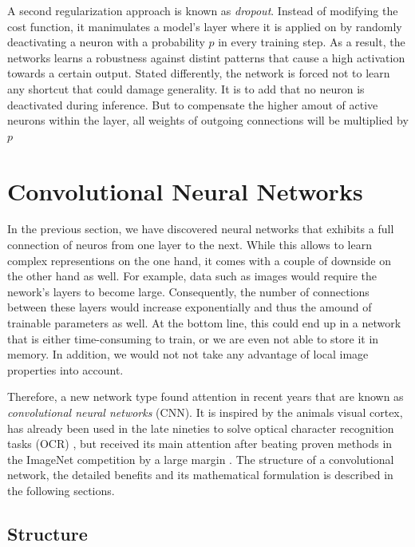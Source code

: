 A second regularization approach is known as \textit{dropout}. Instead of modifying the cost function, it manimulates a model's layer where it is applied on by randomly deactivating a neuron with a probability $p$ in every training step. As a result, the networks learns a robustness against distint patterns that cause a high activation towards a certain output. Stated differently, the network is forced not to learn any shortcut that could damage generality. It is to add that no neuron is deactivated during inference. But to compensate the higher amout of active neurons within the layer, all weights of outgoing connections will be multiplied by $ p $ \parencite[p. 1931]{dropout}



\section{Convolutional Neural Networks}

In the previous section, we have discovered neural networks that exhibits a full connection of neuros from one layer to the next. While this allows to learn complex representions on the one hand, it comes with a couple of downside on the other hand as well. For example, data such as images would require the nework's layers to become large. Consequently, the number of connections between these layers would increase exponentially and thus the amound of trainable parameters as well. At the bottom line, this could end up in a network that is either time-consuming to train, or we are even not able to store it in memory. In addition, we would not not take any advantage of local image properties into account.

Therefore, a new network type found attention in recent years that are known as \textit{convolutional neural networks} (CNN). It is inspired by the animals visual cortex, has already been used in the late nineties to solve optical character recognition tasks (OCR) \parencite{lecun_conv}, but received its main attention after beating proven methods in the ImageNet competition by a large margin \parencite{imagenet}. The structure of a convolutional network, the detailed benefits and its mathematical formulation is described in the following sections.


\subsection{Structure}


